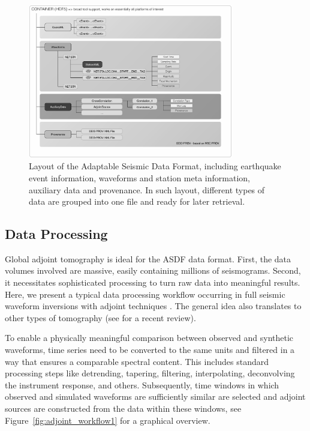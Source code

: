 \begin{figure}
  \centering
  \includegraphics[width=0.8\textwidth]{ch-workflow/figures/ASDF_container_bw}
  \caption[Layout of the Adaptable Seismic Data Format]
  {Layout of the Adaptable Seismic Data Format, including earthquake
  event information, waveforms and station meta information, auxiliary data and
  provenance. In such layout, different types of data are grouped into
  one file and ready for later retrieval.}
  \label{fig:asdf_container1}
\end{figure}

\subsection{Data Processing}

Global adjoint tomography is ideal for the ASDF data format.
First, the data volumes involved are massive, easily containing millions of
seismograms. Second, it necessitates sophisticated processing to turn raw data
into meaningful results. Here, we present a typical data processing workflow
occurring in full seismic waveform inversions with adjoint techniques
\cite{Tromp2005, Fichtner2006, Tape2010, zhu2012structure}.
The general idea also
translates to other types of tomography (see \cite{Liu2012} for a recent review).

To enable a physically meaningful comparison between observed and synthetic
waveforms, time series need to be converted to the same units and filtered in a
way that ensures a comparable spectral content. This includes standard
processing steps like detrending, tapering, filtering, interpolating,
deconvolving the instrument response, and others. Subsequently, time windows in
which observed and simulated waveforms are sufficiently similar are selected and adjoint sources
are constructed from the data within these windows, see
Figure~\ref{fig:adjoint_workflow1} for a graphical overview.

